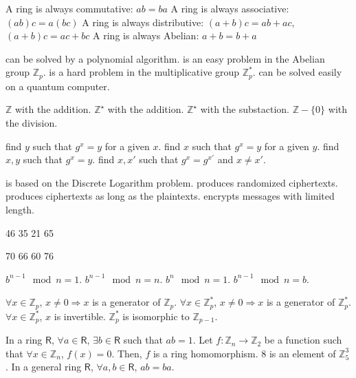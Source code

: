 {A ring is always commutative:  $ab=ba$}
{A ring is always associative:  $(ab)c=a(bc)$}
{A ring is always distributive:  $(a+b)c=ab+ac$, $(a+b)c=ac+bc$}
{A ring is always Abelian: $a+b = b+a$}

 {can be solved by a polynomial algorithm.}
 {is an easy problem in the Abelian group $\mathbb{Z}_p$.}
 {is a hard problem in the multiplicative group $\mathbb{Z}_p^*$.}
 {can be solved easily on a quantum computer.}

 {$\mathbb{Z}$ with the addition.}
 {$\mathbb{Z}^\star$ with the addition.}
 {$\mathbb{Z}^\star$ with the substaction.}
 {$\mathbb{Z}-\{0\}$ with the division.}

{find $y$ such that $g^x=y$ for a given $x$.}
{find $x$ such that $g^x=y$ for a given $y$.}
{find $x,y$ such that $g^x=y$.}
{find $x,x'$ such that $g^x=g^{x'}$ and $x\ne x'$.}

{is based on the Discrete Logarithm problem.}
{produces randomized ciphertexts.}
{produces ciphertexts as long as the plaintexts.}
{encrypts messages with limited length.}

{46}
{35}
{21}
{65}



{70}
{66}
{60}
{76}

 {$b^{n-1}\mod n = 1$.}
 {$b^{n-1}\mod n = n$.}
 {$b^{n}\mod n = 1$.}
 {$b^{n-1}\mod n = b$.}

 {$\forall x  \in \mathbb{Z}_p$, $x \neq 0 \Longrightarrow x$ is a  generator of $\mathbb{Z}_p$.}
 {$\forall x  \in \mathbb{Z}_p^*$, $x \neq 0 \Longrightarrow x$ is  a generator of $\mathbb{Z}_p^*$.}
 {$\forall x  \in \mathbb{Z}_p^*$, $x$ is invertible.}
 {$\mathbb{Z}_p^*$ is isomorphic to  $\mathbb{Z}_{p-1}$.}


 {In a ring $\mathsf{R}$, $\forall a \in \mathsf{R}$, $\exists b \in \mathsf{R}$ such that $ab=1$. }
{Let $f: \mathbb{Z}_n \rightarrow \mathbb{Z}_2$ be a function such that $\forall x \in  \mathbb{Z}_n$, $f(x)=0$. Then,  $f$ is a ring homomorphism.}
{8 is an element of $\mathbb{Z}_5^3$.}
{In a general ring $\mathsf{R}$, $\forall a,b \in \mathsf{R}$,   $ab=ba$.}

